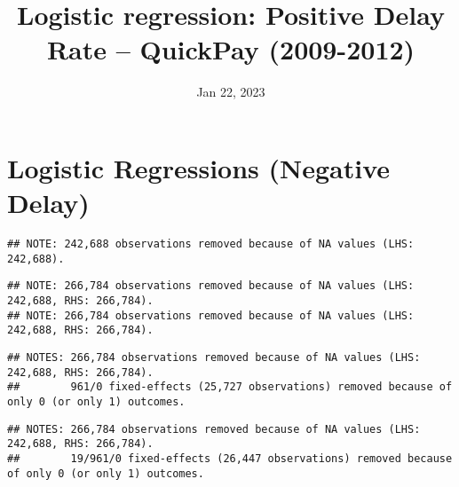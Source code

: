 \documentclass[
]{article}
\title{Logistic regression: Positive Delay Rate -- QuickPay (2009-2012)}
\author{}
\date{\vspace{-2.5em}Jan 22, 2023}
\begin{document}
\maketitle

\hypertarget{logistic-regressions-negative-delay}{%
\section{Logistic Regressions (Negative
Delay)}\label{logistic-regressions-negative-delay}}

\begin{verbatim}
## NOTE: 242,688 observations removed because of NA values (LHS: 242,688).
\end{verbatim}

\begin{verbatim}
## NOTE: 266,784 observations removed because of NA values (LHS: 242,688, RHS: 266,784).
## NOTE: 266,784 observations removed because of NA values (LHS: 242,688, RHS: 266,784).
\end{verbatim}

\begin{verbatim}
## NOTES: 266,784 observations removed because of NA values (LHS: 242,688, RHS: 266,784).
##        961/0 fixed-effects (25,727 observations) removed because of only 0 (or only 1) outcomes.
\end{verbatim}

\begin{verbatim}
## NOTES: 266,784 observations removed because of NA values (LHS: 242,688, RHS: 266,784).
##        19/961/0 fixed-effects (26,447 observations) removed because of only 0 (or only 1) outcomes.
\end{verbatim}
\end{document}
